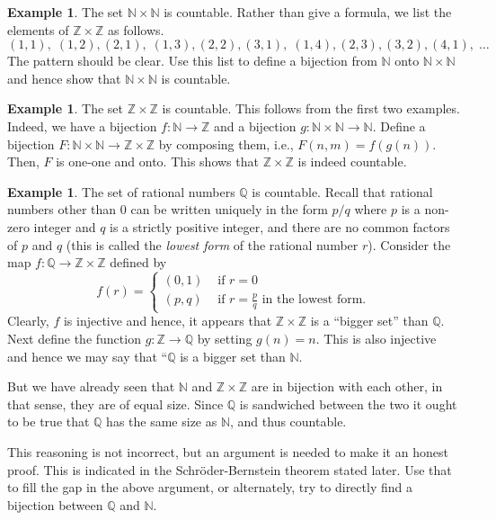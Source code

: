 \documentclass[preprint,  11pt]{amsart}
\theoremstyle{plain} %
\theoremstyle{definition} %
\newtheorem{example}[theorem]{Example}
\begin{document}
{\begin{example} The set $\mathbb{N}\times \mathbb{N}$ is countable. Rather than give a formula, we list the elements of $\mathbb{Z}\times \mathbb{Z}$ as follows.
$$
(1,1), \; (1,2), (2,1), \; (1,3), (2,2), (3,1), \; (1,4),(2,3),(3,2),(4,1),  \; \ldots
$$
The pattern should be clear. Use this list to define a bijection from $\mathbb{N}$ onto $\mathbb{N}\times \mathbb{N}$ and hence show that $\mathbb{N}\times \mathbb{N}$ is countable.
\end{example}

\begin{example} The set $\mathbb{Z}\times \mathbb{Z}$ is countable. This follows from the first two examples. Indeed, we have a bijection $f:\mathbb{N}\rightarrow \mathbb{Z}$ and a bijection $g:\mathbb{N}\times \mathbb{N} \rightarrow \mathbb{N}$. Define a bijection $F:\mathbb{N}\times \mathbb{N}\rightarrow \mathbb{Z}\times \mathbb{Z}$ by composing them, i.e., $F(n,m)=f(g(n))$. Then, $F$ is one-one and onto. This shows that $\mathbb{Z}\times \mathbb{Z}$ is indeed countable.
\end{example}

\begin{example} The set of rational numbers $\mathbb{Q}$ is countable. Recall that rational numbers other than $0$ can be written uniquely in the form $p/q$ where $p$ is a non-zero integer and $q$ is a strictly positive integer, and there are no common factors of $p$ and $q$ (this is called the {\em lowest form} of the rational number $r$). Consider the map $f:\mathbb{Q}\rightarrow \mathbb{Z}\times \mathbb{Z}$ defined by
$$
f(r) = \begin{cases} (0,1) & \mbox{ if }r=0 \\ (p,q) & \mbox{ if }r=\frac{p}{q} \mbox{ in the lowest form}. \end{cases}
$$
Clearly, $f$ is injective and hence, it appears that $\mathbb{Z}\times \mathbb{Z}$ is a ``bigger set'' than $\mathbb{Q}$. Next define the function $g:\mathbb{Z}\rightarrow \mathbb{Q}$ by setting $g(n)=n$. This is also injective and hence we may say that ``$\mathbb{Q}$ is a bigger set than $\mathbb{N}$.

But we  have already seen that $\mathbb{N}$ and $\mathbb{Z}\times \mathbb{Z}$ are in bijection with each other, in that sense, they are of equal size. Since $\mathbb{Q}$ is sandwiched between the two it ought to be true that $\mathbb{Q}$ has the same size as $\mathbb{N}$, and thus countable.

This reasoning is not incorrect, but an argument is needed to make it an honest proof. This is indicated in the Schr\"{o}der-Bernstein theorem stated later. Use that to fill the gap in the above argument, or alternately, try to directly find a bijection between $\mathbb{Q}$ and $\mathbb{N}$.
\end{example}



}
\end{document}
